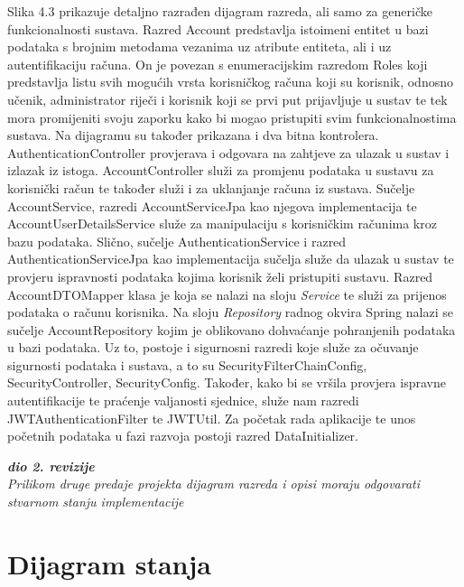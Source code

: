 			\newpage
			
			Slika 4.3 prikazuje detaljno razrađen dijagram razreda, ali samo za generičke funkcionalnosti sustava. Razred Account predstavlja istoimeni entitet u bazi podataka s brojnim metodama vezanima uz atribute entiteta, ali i uz autentifikaciju računa. On je povezan s enumeracijskim razredom Roles koji predstavlja listu svih mogućih vrsta korisničkog računa koji su korisnik, odnosno učenik, administrator riječi i korisnik koji se prvi put prijavljuje u sustav te tek mora promijeniti svoju zaporku kako bi mogao pristupiti svim funkcionalnostima sustava. Na dijagramu su također prikazana i dva bitna kontrolera. AuthenticationController provjerava i odgovara na zahtjeve za ulazak u sustav i izlazak iz istoga. AccountController služi za promjenu podataka u sustavu za korisnički račun te također služi i za uklanjanje računa iz sustava. Sučelje AccountService, razredi AccountServiceJpa kao njegova implementacija te AccountUserDetailsService služe za manipulaciju s korisničkim računima kroz bazu podataka. Slično, sučelje AuthenticationService i razred AuthenticationServiceJpa kao implementacija sučelja služe da ulazak u sustav te provjeru ispravnosti podataka kojima korisnik želi pristupiti sustavu. Razred AccountDTOMapper klasa je koja se nalazi na sloju \textit{Service} te služi za prijenos podataka o računu korisnika. Na sloju \textit{Repository} radnog okvira Spring nalazi se sučelje AccountRepository kojim je oblikovano dohvaćanje pohranjenih podataka u bazi podataka. Uz to, postoje i sigurnosni razredi koje služe za očuvanje sigurnosti podataka i sustava, a to su SecurityFilterChainConfig, SecurityController, SecurityConfig. Također, kako bi se vršila provjera ispravne autentifikacije te praćenje valjanosti sjednice, služe nam razredi JWTAuthenticationFilter te JWTUtil. Za početak rada aplikacije te unos početnih podataka u fazi razvoja postoji razred DataInitializer.
			
			\newpage
			
			\textbf{\textit{dio 2. revizije}}\\			
			
			\textit{Prilikom druge predaje projekta dijagram razreda i opisi moraju odgovarati stvarnom stanju implementacije}
			
			
			
			\eject
		
		\section{Dijagram stanja}
			
